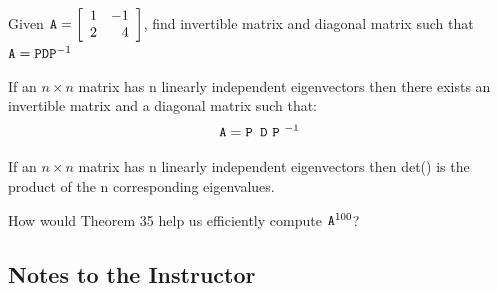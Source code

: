 \begin{myexc}[\bd{c}]
	Given $\texttt{A} = \left[ \begin{array}{rr} 1 & -1  \\ 2 & 4  \end{array} \right]$, find invertible matrix  and diagonal matrix  such that $\texttt{A} = \texttt{P}\texttt{D}\texttt{P}^{-1}$ 
\end{myexc}


\begin{theorem}
	If an $n\times n$ matrix has n linearly independent eigenvectors then there exists an invertible matrix  and a diagonal matrix  such that: \[	\mtx{A} = \mtx{P }\mtx{D}\ \mtx{P}^{\ -1} \]
\end{theorem}

\vspace{.5cm}

\noindent {} 	If an $n\times n$ matrix  has n linearly independent eigenvectors then det() is the product of the n corresponding eigenvalues. 

\vspace{.5cm}

\noindent {} How would Theorem 35 help us efficiently compute $\texttt{A}^{100}$?



















\backmatter

\begin{annotation}
\chapter{Notes to the Instructor}

\renewcommand\notesname{}
\vspace{-2cm}
\begingroup
\setlength{\parskip}{2ex}
\renewcommand{\enotesize}{\normalsize}

\theendnotes

\endgroup

\end{annotation}





